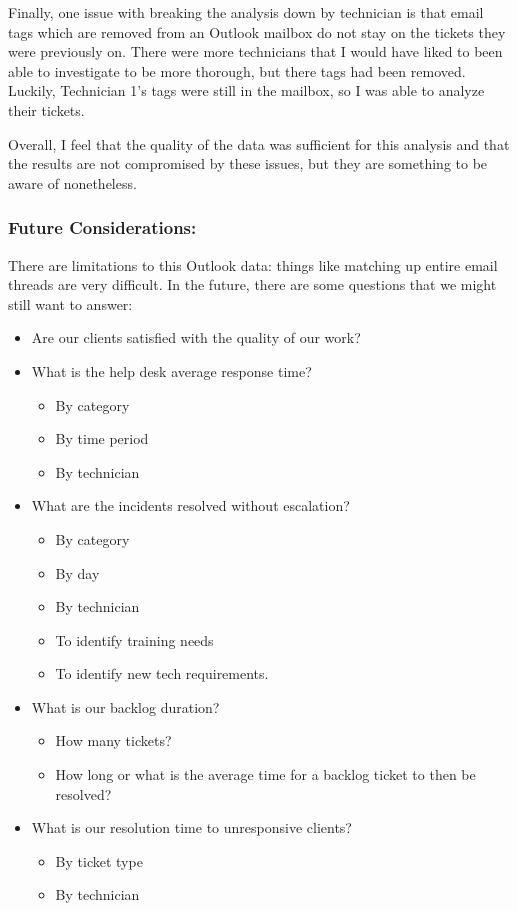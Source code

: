 \documentclass[11pt]{article}
\providecommand{\tightlist}{%
      \setlength{\itemsep}{0pt}\setlength{\parskip}{0pt}}
\begin{document}
Finally, one issue with breaking the analysis down by technician is that
email tags which are removed from an Outlook mailbox do not stay on the
tickets they were previously on. There were more technicians that I
would have liked to been able to investigate to be more thorough, but
there tags had been removed. Luckily, Technician 1's tags were still in
the mailbox, so I was able to analyze their tickets.

Overall, I feel that the quality of the data was sufficient for this
analysis and that the results are not compromised by these issues, but
they are something to be aware of nonetheless.

\hypertarget{future-considerations}{%
\subsubsection{Future Considerations:}\label{future-considerations}}

There are limitations to this Outlook data: things like matching up
entire email threads are very difficult. In the future, there are some
questions that we might still want to answer:

\begin{itemize}
\item
  Are our clients satisfied with the quality of our work?
\item
  What is the help desk average response time?

  \begin{itemize}
  \tightlist
  \item
    By category
  \item
    By time period
  \item
    By technician
  \end{itemize}
\item
  What are the incidents resolved without escalation?

  \begin{itemize}
  \tightlist
  \item
    By category
  \item
    By day
  \item
    By technician
  \item
    To identify training needs
  \item
    To identify new tech requirements.
  \end{itemize}
\item
  What is our backlog duration?

  \begin{itemize}
  \tightlist
  \item
    How many tickets?
  \item
    How long or what is the average time for a backlog ticket to then be
    resolved?
  \end{itemize}
\item
  What is our resolution time to unresponsive clients?

  \begin{itemize}
  \tightlist
  \item
    By ticket type
  \item
    By technician
  \end{itemize}
\end{itemize}

   



    
\end{document}
